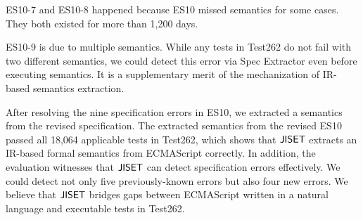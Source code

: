 ES10-7 and ES10-8 happened because ES10 missed semantics for some
cases.  They both existed for more than 1,200 days.

ES10-9 is due to multiple semantics.  While any tests in Test262 do not fail
with two different semantics, we could detect this error via {\sf Spec
Extractor} even before executing semantics. It is a supplementary merit of
the mechanization of IR-based semantics extraction.

After resolving the nine specification errors in ES10, we extracted a
semantics from the revised specification.  The extracted semantics
from the revised ES10 passed all 18,064 applicable tests in Test262,
which shows that \( \text{\sf JISET} \) extracts an IR-based formal semantics
from ECMAScript correctly.  In addition, the evaluation witnesses that
\( \text{\sf JISET} \) can detect specification errors effectively.
We could detect not only five previously-known errors
but also four new errors.  We believe that \( \text{\sf JISET} \) bridges gaps
between ECMAScript written in a natural language and executable tests
in Test262.

